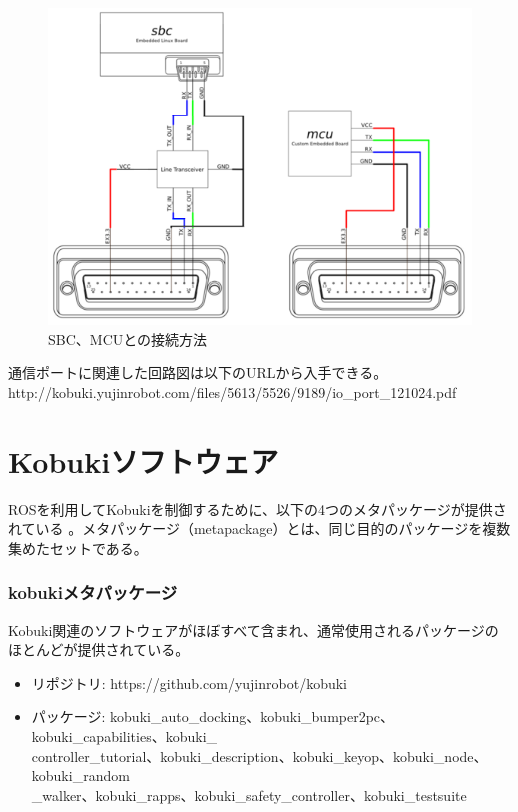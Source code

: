 \begin{figure}[htp]
  \centering
  \includegraphics[width=12cm]{pictures/chapter9/pic_09_10.png}
  \caption{SBC、MCUとの接続方法}
\end{figure}

\begin{exercise}[通信ポート関連回路図の入手先]
通信ポートに関連した回路図は以下のURLから入手できる。
\\http://kobuki.yujinrobot.com/files/5613/5526/9189/io\_port\_121024.pdf
\end{exercise}

\section{Kobukiソフトウェア}

ROSを利用してKobukiを制御するために、以下の4つのメタパッケージが提供されている  。メタパッケージ（metapackage）とは、同じ目的のパッケージを複数集めたセットである。

\subsubsection{kobukiメタパッケージ}

Kobuki関連のソフトウェアがほぼすべて含まれ、通常使用されるパッケージのほとんどが提供されている。

\begin{itemize}
\item リポジトリ: https://github.com/yujinrobot/kobuki
\item パッケージ: kobuki\_auto\_docking、kobuki\_bumper2pc、kobuki\_capabilities、kobuki\_\\controller\_tutorial、kobuki\_description、kobuki\_keyop、kobuki\_node、kobuki\_random\\\_walker、kobuki\_rapps、kobuki\_safety\_controller、kobuki\_testsuite
\end{itemize}

